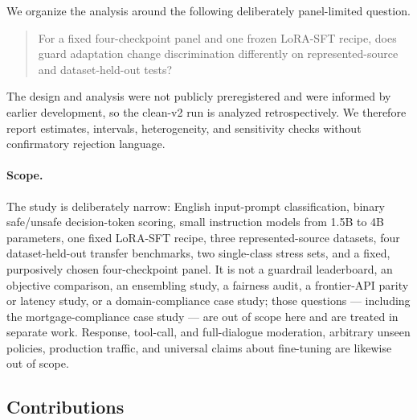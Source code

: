 \documentclass[11pt]{article}
\begin{document}
We organize the analysis around the following deliberately panel-limited question.

\begin{quote}
For a fixed four-checkpoint panel and one frozen LoRA-SFT recipe, does guard adaptation change discrimination differently on represented-source and dataset-held-out tests?
\end{quote}

The design and analysis were not publicly preregistered and were informed by earlier development, so the clean-v2 run is analyzed retrospectively. We therefore report estimates, intervals, heterogeneity, and sensitivity checks without confirmatory rejection language.

\paragraph{Scope.} The study is deliberately narrow: English input-prompt classification, binary safe/unsafe decision-token scoring, small instruction models from 1.5B to 4B parameters, one fixed LoRA-SFT recipe, three represented-source datasets, four dataset-held-out transfer benchmarks, two single-class stress sets, and a fixed, purposively chosen four-checkpoint panel. It is not a guardrail leaderboard, an objective comparison, an ensembling study, a fairness audit, a frontier-API parity or latency study, or a domain-compliance case study; those questions --- including the mortgage-compliance case study --- are out of scope here and are treated in separate work. Response, tool-call, and full-dialogue moderation, arbitrary unseen policies, production traffic, and universal claims about fine-tuning are likewise out of scope.

\subsection{Contributions}
\label{sec:contributions}
\end{document}
